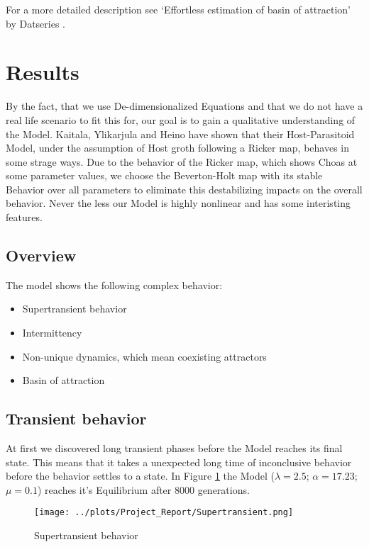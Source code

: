 \documentclass[a4paper,12pt, twoside]{article} %
\begin{document}
For a more detailed description see `Effortless estimation of basin of attraction' by Datseries \autocite{datseris}.

\section{Results}

By the fact, that we use De-dimensionalized Equations and that we do not have a real life scenario to fit this for, our goal is to gain a qualitative understanding of the Model.
Kaitala, Ylikarjula and Heino have shown that their Host-Parasitoid Model, under the assumption of Host groth following a Ricker map, behaves in some strage ways. Due to the behavior
of the Ricker map, which shows Choas at some parameter values, we choose the Beverton-Holt map with its stable Behavior over all parameters to eliminate this destabilizing impacts on
the overall behavior. Never the less our Model is highly nonlinear and has some interisting features.

\subsection{Overview}
The model shows the following complex behavior:
\begin{itemize}
  \item Supertransient behavior
  \item Intermittency
  \item Non-unique dynamics, which mean coexisting attractors
  \item Basin of attraction
\end{itemize}


\subsection{Transient behavior}
At first we discovered long transient phases before the Model reaches its final state. This means that it takes a unexpected long time of inconclusive behavior before the behavior settles
to a state. In Figure \ref{fig:transient} the Model ($\lambda=2.5$; $\alpha = 17.23 $; $ \mu = 0.1$) reaches it's Equilibrium after 8000 generations. 

\begin{figure}[H]
\begin{centering}
\texttt{[image: ../plots/Project\_Report/Supertransient.png]}
\caption{Supertransient behavior}\label{fig:transient}
\end{centering}
\end{figure}
\end{document}
